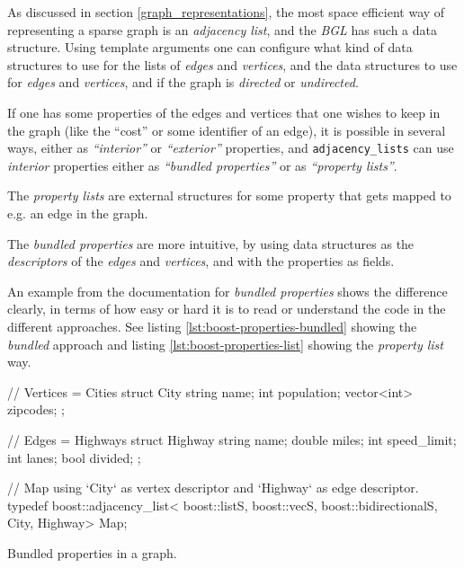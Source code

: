 \documentclass[../main.tex]{subfiles}
\begin{document}
As discussed in section \ref{graph_representations}, the most space efficient way of representing a sparse graph is an \textit{adjacency list}, and the \textit{BGL} has such a data structure. Using template arguments one can configure what kind of data structures to use for the lists of \textit{edges} and \textit{vertices}, and the data structures to use for \textit{edges} and \textit{vertices}, and if the graph is \textit{directed} or \textit{undirected}.

If one has some properties of the edges and vertices that one wishes to keep in the graph (like the ``cost'' or some identifier of an edge), it is possible in several ways, either as \textit{``interior''} or \textit{``exterior''} properties, and \texttt{adjacency\_lists} can use \textit{interior} properties either as \textit{``bundled properties''} or as \textit{``property lists''}.

The \textit{property lists} are external structures for some property that gets mapped to e.g. an edge in the graph.

The \textit{bundled properties} are more intuitive, by using data structures as the \textit{descriptors} of the \textit{edges} and \textit{vertices}, and with the properties as fields.

An example from the documentation for \textit{bundled properties} \cite{boost-bundled-properties-doc} shows the difference clearly, in terms of how easy or hard it is to read or understand the code in the different approaches. See listing \ref{lst:boost-properties-bundled} showing the \textit{bundled} approach and listing \ref{lst:boost-properties-list} showing the \textit{property list} way.

\begin{mylisting}
\begin{cppcode}
// Vertices = Cities
struct City
{
  string name;
  int population;
  vector<int> zipcodes;
};

// Edges = Highways
struct Highway
{
  string name;
  double miles;
  int speed_limit;
  int lanes;
  bool divided;
};

// Map using `City` as vertex descriptor and `Highway` as edge descriptor.
typedef boost::adjacency_list<
    boost::listS, boost::vecS, boost::bidirectionalS,
    City, Highway>
  Map;
\end{cppcode}
\caption{Bundled properties in a graph.}
\label{lst:boost-properties-bundled}
\end{mylisting}
\end{document}
